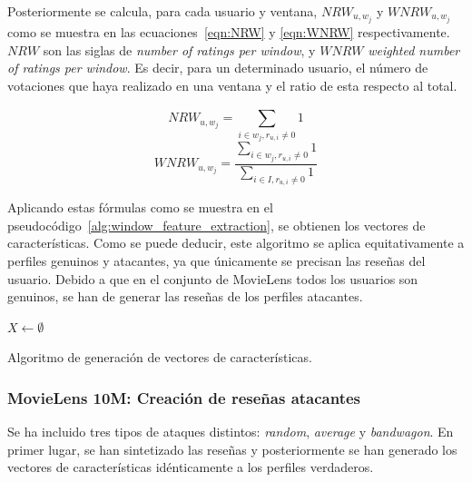 Posteriormente se calcula, para cada usuario y ventana, $NRW_{u, w_j}$ y  $WNRW_{u, w_j}$ como se muestra en las ecuaciones~\ref{eqn:NRW} y \ref{eqn:WNRW} respectivamente. $NRW$ son las siglas de \textit{number of ratings per window}, y $WNRW$ \textit{weighted number of ratings per window}. Es decir, para un determinado usuario, el número de votaciones que haya realizado en una ventana y el ratio de esta respecto al total.

\begin{equation}\label{eqn:NRW} NRW_{u, w_j} = \sum_{i\in w_j, r_{u,i} \ne 0}^{} 1 \end{equation}
\begin{equation}\label{eqn:WNRW} WNRW_{u, w_j} = \frac{\sum_{i\in w_j, r_{u,i} \ne 0}^{} 1}{\sum_{i\in I, r_{u,i} \ne 0}^{} 1} \end{equation}

Aplicando estas fórmulas como se muestra en el pseudocódigo~\ref{alg:window_feature_extraction}, se obtienen los vectores de características. Como se puede deducir, este algoritmo se aplica equitativamente a perfiles genuinos y atacantes, ya que únicamente se precisan las reseñas del usuario. Debido a que en el conjunto de MovieLens todos los usuarios son genuinos, se han de generar las reseñas de los perfiles atacantes.

\begin{algorithm}
	\BlankLine
	$X \leftarrow \emptyset$\\
	\caption{Algoritmo de generación de vectores de características.}
	\label{alg:window_feature_extraction}
\end{algorithm}


\subsubsection{MovieLens 10M: Creación de reseñas atacantes}

Se ha incluido tres tipos de ataques distintos: \textit{random}, \textit{average} y \textit{bandwagon}. En primer lugar, se han sintetizado las reseñas y posteriormente se han generado los vectores de características idénticamente a los perfiles verdaderos.

